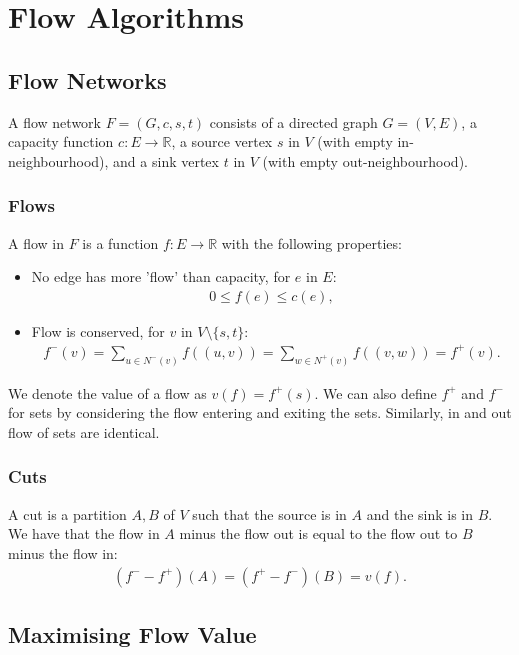 \section{Flow Algorithms}

\subsection{Flow Networks}

A flow network $F = (G, c, s, t)$ consists of a directed graph $G = (V, E)$, a capacity function
$c : E \to \mathbb{R}$, a source vertex $s$ in $V$ (with empty in-neighbourhood), and a sink
vertex $t$ in $V$ (with empty out-neighbourhood).

\subsubsection{Flows}

A flow in $F$ is a function $f : E \to \mathbb{R}$ with the following properties: \begin{itemize}
  \item No edge has more 'flow' than capacity, for $e$ in $E$: \begin{gather*}
    0 \leq f(e) \leq c(e),
  \end{gather*}
  \item Flow is conserved, for $v$ in $V \setminus \{s, t\}$: \begin{gather*}
    f^-(v) = \sum_{u \in N^-(v)} f((u, v)) = \sum_{w \in N^+(v)} f((v, w)) = f^+(v).
  \end{gather*}
\end{itemize} We denote the value of a flow as $v(f) = f^+(s)$. We can also define $f^+$ and $f^-$
for sets by considering the flow entering and exiting the sets. Similarly, in and out flow
of sets are identical.

\subsubsection{Cuts}

A cut is a partition $A, B$ of $V$ such that the source is in $A$ and the sink is in $B$.
We have that the flow in $A$ minus the flow out is equal to the flow out to $B$ minus the flow in:
\begin{gather*}
  (f^- - f^+)(A) = (f^+ - f^-)(B) = v(f).
\end{gather*}

\subsection{Maximising Flow Value}


